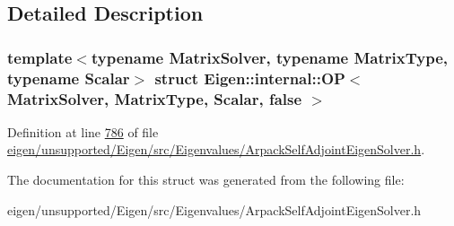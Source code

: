 \subsection{Detailed Description}
\subsubsection*{template$<$typename Matrix\+Solver, typename Matrix\+Type, typename Scalar$>$\newline
struct Eigen\+::internal\+::\+O\+P$<$ Matrix\+Solver, Matrix\+Type, Scalar, false $>$}



Definition at line \hyperlink{eigen_2unsupported_2_eigen_2src_2_eigenvalues_2_arpack_self_adjoint_eigen_solver_8h_source_l00786}{786} of file \hyperlink{eigen_2unsupported_2_eigen_2src_2_eigenvalues_2_arpack_self_adjoint_eigen_solver_8h_source}{eigen/unsupported/\+Eigen/src/\+Eigenvalues/\+Arpack\+Self\+Adjoint\+Eigen\+Solver.\+h}.



The documentation for this struct was generated from the following file\+:\begin{DoxyCompactItemize}
\item 
eigen/unsupported/\+Eigen/src/\+Eigenvalues/\+Arpack\+Self\+Adjoint\+Eigen\+Solver.\+h\end{DoxyCompactItemize}
